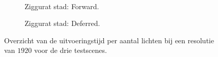 \begin{figure}[t]
\begin{adjustbox}{minipage=\textwidth, scale=0.55}
  \end{adjustbox} \\
  \begin{adjustbox}{minipage=\textwidth, scale=0.55}
    \begin{subfigure}[b]{0.8\textwidth}
      \centering
      \def\svgwidth{\textwidth}
      
      \caption{Ziggurat stad: Forward.}
      \label{fig:ts-lights-forward:city}
    \end{subfigure}
  \end{adjustbox}\hspace{-0.075\textwidth} %
  \begin{adjustbox}{minipage=\textwidth, scale=0.55}
    \begin{subfigure}[b]{0.8\textwidth}
      \centering
      \def\svgwidth{\textwidth}
      
      \caption{Ziggurat stad: Deferred.}
      \label{fig:ts-lights-deferred:city}
    \end{subfigure}
  \end{adjustbox}
  \caption{Overzicht van de uitvoeringstijd per aantal lichten bij een resolutie
           van $1920$ voor de drie testscenes.}
  \label{fig:ts-lights}
\end{figure}

